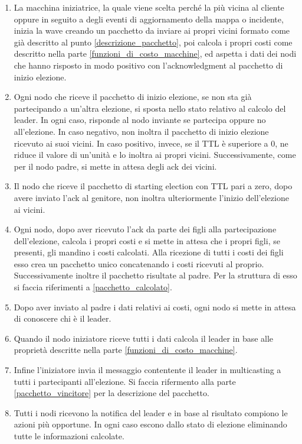 \begin{enumerate}
	\item La macchina iniziatrice, la quale viene scelta perché la più vicina al cliente oppure in seguito a degli eventi di aggiornamento della mappa o incidente, inizia la wave creando un pacchetto da inviare ai propri vicini formato come già descritto al punto \ref{descrizione_pacchetto}, poi calcola i propri costi come descritto nella parte \ref{funzioni_di_costo_macchine}, ed aspetta i dati dei nodi che hanno risposto in modo positivo con l'acknowledgment al pacchetto di inizio elezione.
	\item Ogni nodo che riceve il pacchetto di inizio elezione, se non sta già partecipando a un'altra elezione, si sposta nello stato relativo al calcolo del leader. In ogni caso, risponde al nodo inviante se partecipa oppure no all'elezione. In caso negativo, non inoltra il pacchetto di inizio elezione ricevuto ai suoi vicini. In caso positivo, invece, se il TTL è superiore a 0, ne riduce il valore di un'unità e lo inoltra ai propri vicini. Successivamente, come per il nodo padre, si mette in attesa degli ack dei vicini.
	\item Il nodo che riceve il pacchetto di starting election con TTL pari a zero, dopo avere inviato l'ack al genitore, non inoltra ulteriormente l'inizio dell'elezione ai vicini.
	\item Ogni nodo, dopo aver ricevuto l'ack da parte dei figli alla partecipazione dell'elezione, calcola i propri costi e si mette in attesa che i propri figli, se presenti, gli mandino i costi calcolati. Alla ricezione di tutti i costi dei figli esso crea un pacchetto unico concatenando i costi ricevuti al proprio. Successivamente inoltre il pacchetto risultate al padre. Per la struttura di esso si faccia riferimenti a \ref{pacchetto_calcolato}.
	\item Dopo aver inviato al padre i dati relativi ai costi, ogni nodo si mette in attesa di conoscere chi è il leader.
	\item Quando il nodo iniziatore riceve tutti i dati calcola il leader in base alle proprietà descritte nella parte \ref{funzioni_di_costo_macchine}. 
	\item Infine l'iniziatore invia il messaggio contentente il leader in multicasting a tutti i partecipanti all'elezione. Si faccia rifermento alla parte \ref{pacchetto_vincitore} per la descrizione del pacchetto.
	\item Tutti i nodi ricevono la notifica del leader e in base al risultato compiono le azioni più opportune. In ogni caso escono dallo stato di elezione eliminando tutte le informazioni calcolate.
\end{enumerate}

